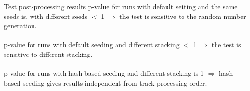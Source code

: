 \documentclass[aspectratio=169, 14pt]{beamer}
\begin{document}
\begin{large}
 \begin{frame}{Test post-processing results}
  p-value for runs with default setting and the same seeds is, with different seeds $<$ 1
  $\Rightarrow$ the test is sensitive to the random number generation.\\\ \\
  p-value for runs with default seeding and different stacking $<$ 1
  $\Rightarrow$ the test is sensitive to different stacking.\\\ \\
  p-value for runs with hash-based seeding and different stacking is 1
  $\Rightarrow$ hash-based seeding gives results independent from track processing order.
 \end{frame}
 
 
 \end{large}
\end{document}
